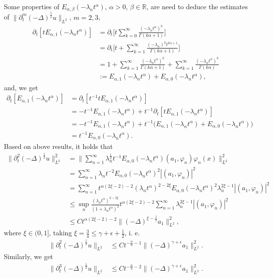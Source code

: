\documentclass[11pt]{article}
\numberwithin{equation}{section}
\begin{document}
Some properties of $E_{\alpha,\beta}(-\lambda_nt^\alpha)$, $\alpha>0$, $\beta\in\mathbb{R}$, are need to deduce the estimates of $\|\partial_t^m(-\Delta)^{\frac12}u\|_{L^2}$, $m=2,3$, 
\begin{align*}
\partial_t[tE_{\alpha,1}(-\lambda_n t^\alpha)]
&= \partial_t\bigg[t\sum_{k=0}^\infty\frac{(-\lambda_nt^\alpha)^k}{\Gamma{(k\alpha+1)}}\bigg]\\
&= \partial_t\bigg[t+\sum_{k=1}^\infty\frac{(-\lambda_n)^kt^{k\alpha+1}}{\Gamma{(k\alpha+1)}}\bigg]\\
&= 1+\sum_{k=1}^\infty\frac{(-\lambda_nt^{\alpha})^k}{\Gamma{(k\alpha+1)}}+\sum_{k=1}^\infty\frac{(-\lambda_nt^{\alpha})^k}{\Gamma{(k\alpha)}}\\
&:=E_{\alpha,1}(-\lambda_nt^\alpha)+E_{\alpha,0}(-\lambda_nt^\alpha),
\end{align*}
and, we get
\begin{align*}
\partial_t[E_{\alpha,1}(-\lambda_n t^\alpha)]
&=\partial_t[t^{-1}tE_{\alpha,1}(-\lambda_n t^\alpha)]\\
&=-t^{-1}E_{\alpha,1}(-\lambda_n t^\alpha)+t^{-1}\partial_t[tE_{\alpha,1}(-\lambda_n t^\alpha)]\\
&=-t^{-1}E_{\alpha,1}(-\lambda_n t^\alpha)+t^{-1}\big(E_{\alpha,1}(-\lambda_nt^\alpha)+E_{\alpha,0}(-\lambda_nt^\alpha)\big)\\
&=t^{-1}E_{\alpha,0}(-\lambda_nt^\alpha).
\end{align*}
Based on above results, it holds that
\begin{align*}
\|\partial_t^2(-\Delta)^{\frac12}u\|_{L^2}^2
& = \bigg\|\sum_{n=1}^{\infty}  \lambda_n^{\frac12}t^{-1}E_{\alpha,0}(-\lambda_n t^\alpha)(a_1, \varphi_n) \varphi_n(x)\bigg\|_{L^2}^2\\
&=\sum_{n=1}^{\infty}  \lambda_nt^{-2}E_{\alpha,0}(-\lambda_n t^\alpha)^2|(a_1, \varphi_n)|^2\\
&=\sum_{n=1}^\infty t^{\alpha(2\xi-2)-2}(\lambda_nt^\alpha)^{2-2\xi}E_{\alpha,0}(-\lambda_n t^\alpha)^2\lambda_n^{2\xi-1}|(a_1, \varphi_n)|^2\\
&\le\sup_n\frac{(\lambda_nt^\alpha)^{2-2\xi}}{(1+\lambda_nt^\alpha)^2}t^{\alpha(2\xi-2)-2}\sum_{n=1}^\infty \lambda_n^{2\xi-1}|(a_1, \varphi_n)|^2\\
&\le Ct^{\alpha(2\xi-2)-2}\|(-\Delta)^{\xi-\frac12}a_1\|_{L^2}^2,
\end{align*}
where $\xi\in(0,1]$, taking $\xi=\frac34\leq\gamma+\epsilon+\frac12$, i. e.
\begin{align*}
\|\partial_t^2(-\Delta)^{\frac12}u\|_{L^2}
&\le Ct^{-\frac{\alpha}{4}-1}\|(-\Delta)^{\gamma+\epsilon}a_1\|_{L^2}^2.
\end{align*}
Similarly, we get
\begin{align*}
\|\partial_t^3(-\Delta)^{\frac12}u\|_{L^2}
&\le Ct^{-\frac{\alpha}{4}-2}\|(-\Delta)^{\gamma+\epsilon}a_1\|_{L^2}^2.
\end{align*}
\end{document}
